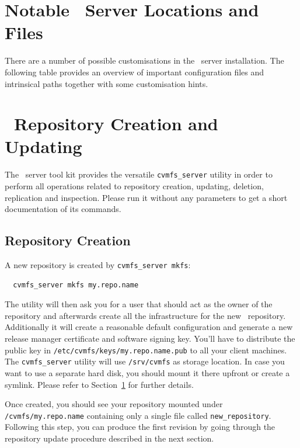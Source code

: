 \pagebreak
\section{Notable \cvmfs\ Server Locations and Files}
\label{sct:repoanatomy}
There are a number of possible customisations in the \cvmfs\ server installation.
The following table provides an overview of important configuration files and intrinsical paths together with some customisation hints.


\section{\cvmfs\ Repository Creation and Updating}
\label{sct:repocreateandupdate}
The \cvmfs\ server tool kit provides the versatile \texttt{cvmfs\_server} utility in order to perform all operations related to repository creation, updating, deletion, replication and inspection.
Please run it without any parameters to get a short documentation of its commands.

\subsection{Repository Creation}
\label{sct:repocreation}

A new repository is created by \texttt{cvmfs\_server mkfs}:
\begin{verbatim}
  cvmfs_server mkfs my.repo.name
\end{verbatim}
The utility will then ask you for a user that should act as the owner of the repository and afterwards create all the infrastructure for the new \cvmfs\ repository.
Additionally it will create a reasonable default configuration and generate a new release manager certificate and software signing key.
You'll have to distribute the public key in \texttt{/etc/cvmfs/keys/my.repo.name.pub} to all your client machines.
The \texttt{cvmfs\_server} utility will use \texttt{/srv/cvmfs} as storage location.
In case you want to use a separate hard disk, you should mount it there upfront or create a symlink.
Please refer to Section~\ref{sct:repoanatomy} for further details.

Once created, you should see your repository mounted under \texttt{/cvmfs/my.repo.name} containing only a single file called \texttt{new\_repository}.
Following this step, you can produce the first revision by going through the repository update procedure described in the next section.


